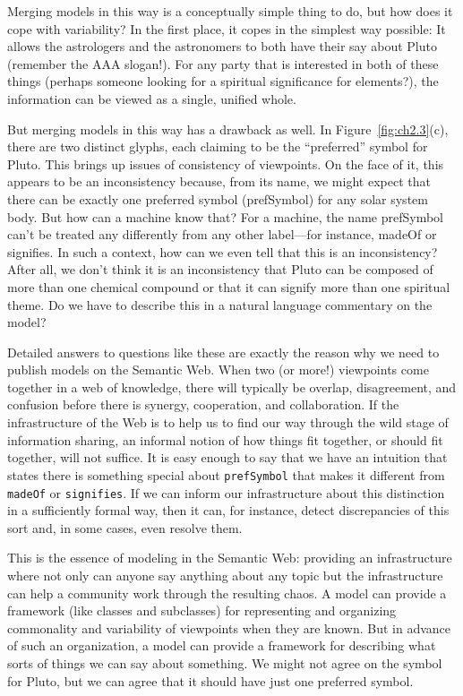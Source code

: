 Merging models in this way is a conceptually simple thing to do, but how
does it cope with variability? In the first place, it copes in the
simplest way possible: It allows the astrologers and the astronomers to
both have their say about Pluto (remember the AAA slogan!). For any
party that is interested in both of these things (perhaps someone
looking for a spiritual significance for elements?), the information can
be viewed as a single, unified whole.

But merging models in this way has a drawback as well. In Figure~\ref{fig:ch2.3}(c),
there are two distinct glyphs, each claiming to be the ``preferred''
symbol for Pluto. This brings up issues of consistency of viewpoints. On
the face of it, this appears to be an inconsistency because, from its
name, we might expect that there can be exactly one preferred symbol
(prefSymbol) for any solar system body. But how can a machine know that?
For a machine, the name prefSymbol can't be treated any differently from
any other label---for instance, madeOf or signifies. In such a context,
how can we even tell that this is an inconsistency? After all, we don't
think it is an inconsistency that Pluto can be composed of more than one
chemical compound or that it can signify more than one spiritual theme.
Do we have to describe this in a natural language commentary on the
model?

Detailed answers to questions like these are exactly the reason why we
need to publish models on the Semantic Web. When two (or more!)
viewpoints come together in a web of knowledge, there will typically be
overlap, disagreement, and confusion before there is synergy,
cooperation, and collaboration. If the infrastructure of the Web is to
help us to find our way through the wild stage of information sharing,
an informal notion of how things fit together, or should fit together,
will not suffice. It is easy enough to say that we have an intuition
that states there is something special about \texttt{prefSymbol} that makes it
different from \texttt{madeOf} or \texttt{signifies}. If we can inform our 
infrastructure about this distinction in a sufficiently formal way, then it
can, for instance, detect discrepancies of this sort and, in some cases,
even resolve them.

This is the essence of modeling in the Semantic Web: providing an
infrastructure where not only can anyone say anything about any topic
but the infrastructure can help a community work through the resulting
chaos. A model can provide a framework (like classes and subclasses) for
representing and organizing commonality and variability of viewpoints
when they are known. But in advance of such an organization, a model can
provide a framework for describing what sorts of things we can say about
something. We might not agree on the symbol for Pluto, but we can agree
that it should have just one preferred symbol.

